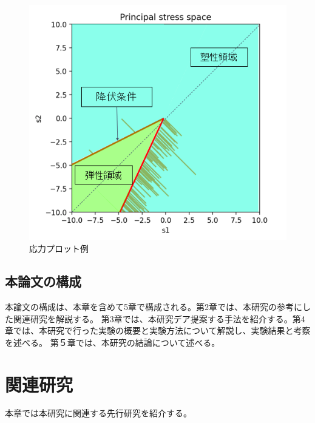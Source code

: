 \documentclass[12pt]{ltjsarticle}
\begin{document}
\begin{figure}[htbp]
  \begin{center}
  \includegraphics*[scale=0.6]{stress_plot_sample.PNG}
  \end{center}
\caption{応力プロット例}
\end{figure}

\subsection{本論文の構成}
本論文の構成は、本章を含めて5章で構成される。第2章では、本研究の参考にした関連研究を解説する。
第3章では、本研究デア提案する手法を紹介する。第4章では、本研究で行った実験の概要と実験方法について解説し、実験結果と考察を述べる。
第５章では、本研究の結論について述べる。

\newpage

\section{関連研究}
本章では本研究に関連する先行研究を紹介する。
\end{document}
